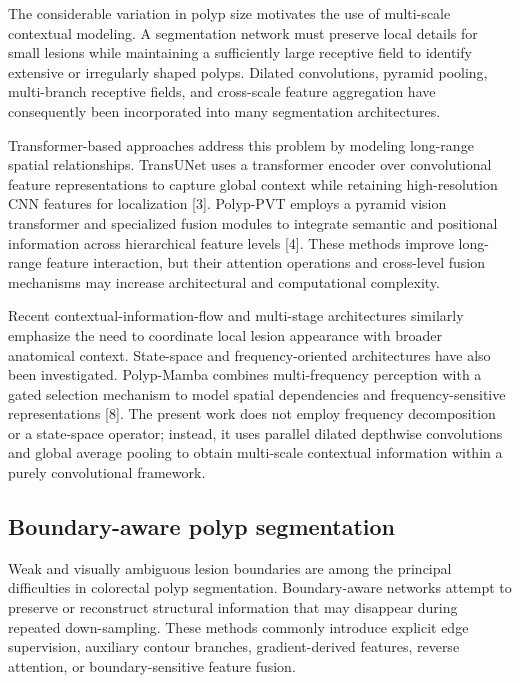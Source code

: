 The considerable variation in polyp size motivates the use of
multi-scale contextual modeling. A segmentation network must preserve
local details for small lesions while maintaining a sufficiently large
receptive field to identify extensive or irregularly shaped polyps.
Dilated convolutions, pyramid pooling, multi-branch receptive fields,
and cross-scale feature aggregation have consequently been incorporated
into many segmentation architectures.

Transformer-based approaches address this problem by modeling long-range
spatial relationships. TransUNet uses a transformer encoder over
convolutional feature representations to capture global context while
retaining high-resolution CNN features for localization {[}3{]}.
Polyp-PVT employs a pyramid vision transformer and specialized fusion
modules to integrate semantic and positional information across
hierarchical feature levels {[}4{]}. These methods improve long-range
feature interaction, but their attention operations and cross-level
fusion mechanisms may increase architectural and computational
complexity.

Recent contextual-information-flow and multi-stage architectures
similarly emphasize the need to coordinate local lesion appearance with
broader anatomical context. State-space and frequency-oriented
architectures have also been investigated. Polyp-Mamba combines
multi-frequency perception with a gated selection mechanism to model
spatial dependencies and frequency-sensitive representations {[}8{]}.
The present work does not employ frequency decomposition or a
state-space operator; instead, it uses parallel dilated depthwise
convolutions and global average pooling to obtain multi-scale contextual
information within a purely convolutional framework.

\subsection{Boundary-aware polyp
segmentation}\label{boundary-aware-polyp-segmentation}

Weak and visually ambiguous lesion boundaries are among the principal
difficulties in colorectal polyp segmentation. Boundary-aware networks
attempt to preserve or reconstruct structural information that may
disappear during repeated down-sampling. These methods commonly
introduce explicit edge supervision, auxiliary contour branches,
gradient-derived features, reverse attention, or boundary-sensitive
feature fusion.

